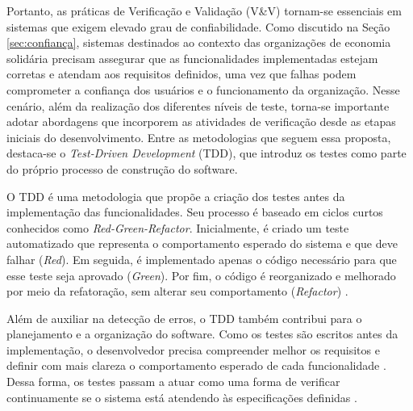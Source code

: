 Portanto, as práticas de Verificação e Validação (V\&V) tornam-se essenciais em sistemas que exigem elevado grau de confiabilidade. Como discutido na Seção \ref{sec:confiança}, sistemas destinados ao contexto das organizações de economia solidária precisam assegurar que as funcionalidades implementadas estejam corretas e atendam aos requisitos definidos, uma vez que falhas podem comprometer a confiança dos usuários e o funcionamento da organização. Nesse cenário, além da realização dos diferentes níveis de teste, torna-se importante adotar abordagens que incorporem as atividades de verificação desde as etapas iniciais do desenvolvimento. Entre as metodologias que seguem essa proposta, destaca-se o \textit{Test-Driven Development} (TDD), que introduz os testes como parte do próprio processo de construção do software.

O TDD é uma metodologia que propõe a criação dos testes antes da implementação das funcionalidades. Seu processo é baseado em ciclos curtos conhecidos como \textit{Red-Green-Refactor}. Inicialmente, é criado um teste automatizado que representa o comportamento esperado do sistema e que deve falhar (\textit{Red}). Em seguida, é implementado apenas o código necessário para que esse teste seja aprovado (\textit{Green}). Por fim, o código é reorganizado e melhorado por meio da refatoração, sem alterar seu comportamento (\textit{Refactor}) \cite{beck2002, fowler2023}.

Além de auxiliar na detecção de erros, o TDD também contribui para o planejamento e a organização do software. Como os testes são escritos antes da implementação, o desenvolvedor precisa compreender melhor os requisitos e definir com mais clareza o comportamento esperado de cada funcionalidade \cite{buchan2011}. Dessa forma, os testes passam a atuar como uma forma de verificar continuamente se o sistema está atendendo às especificações definidas \cite{santos2025}.